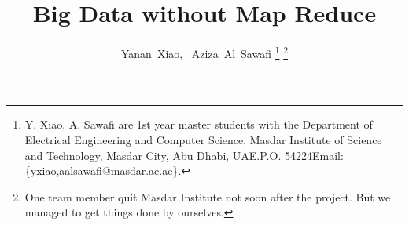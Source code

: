 \documentclass[journal]{IEEEtran}
\begin{document}
%

\title{Big Data without Map Reduce}

%
%
%

\author{Yanan~Xiao,~
Aziza~Al~Sawafi%
\thanks{Y. Xiao, A. Sawafi are 1st year master students with the Department of
Electrical Engineering and Computer Science, Masdar Institute of Science and Technology, Masdar City,
Abu Dhabi, UAE.\@ P.O. 54224\@ Email: \{yxiao,aalsawafi@masdar.ac.ae\}.}%
\thanks{One team member quit Masdar Institute not soon after the
  project. But we managed to get things done by ourselves.}}
%

%
%
\end{document}
